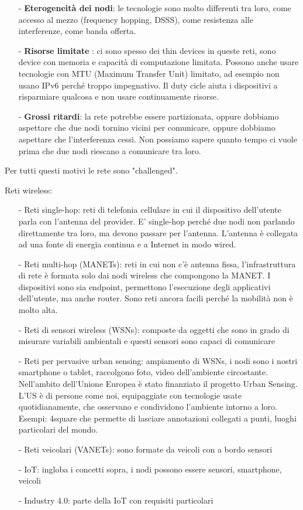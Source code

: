 \documentclass[12pt,italian]{report}
\begin{document}
\begin{itemize}
    \item[-] \textbf{Eterogeneità dei nodi}: le tecnologie sono molto differenti tra loro, come accesso al mezzo (frequency hopping, DSSS), come resistenza alle interferenze, come banda offerta. 
    
    \item[-] \textbf{Risorse limitate} : ci sono spesso dei thin devices in queste reti, sono device con memoria e capacità di computazione limitata. Possono anche usare tecnologie con MTU (Maximum Transfer Unit) limitato, ad esempio non usano IPv6 perché troppo impegnativo. Il duty cicle aiuta i dispositivi a risparmiare qualcosa e non usare continuamente risorse.
    
    \item[-] \textbf{Grossi ritardi}: la rete potrebbe essere partizionata, oppure dobbiamo aspettare che due nodi tornino vicini per comunicare, oppure dobbiamo aspettare che l'interferenza cessi. Non possiamo sapere quanto tempo ci vuole prima che due nodi riescano a comunicare tra loro. 
    
\end{itemize}
Per tutti questi motivi le rete sono "challenged".
\bigbreak

\noindent Reti wireless:
\begin{itemize}
    \item[-] Reti single-hop: reti di telefonia cellulare in cui il dispositivo dell'utente parla con l'antenna del provider. E' single-hop perché due nodi non parlando direttamente tra loro, ma devono passare per l'antenna. L'antenna è collegata ad una fonte di energia continua e a Internet in modo wired.
    \item[-] Reti multi-hop (MANETs): reti in cui non c'è antenna fissa, l'infrastruttura di rete è formata solo dai nodi wireless che compongono la MANET. I dispositivi sono sia endpoint, permettono l'esecuzione degli applicativi dell'utente, ma anche router. Sono reti ancora facili perché la mobilità non è molto alta.
    \item[-] Reti di sensori wireless (WSNs): composte da oggetti che sono in grado di misurare variabili ambientali e questi sensori sono capaci di comunicare
    \item[-] Reti per pervasive urban sensing: ampiamento di WSNs, i nodi sono i nostri smartphone o tablet, raccolgono foto, video dell'ambiente circostante. 
    Nell'ambito dell'Unione Europea è stato finanziato il progetto Urban Sensing. L'US è di persone come noi, equipaggiate con tecnologie usate quotidianamente, che osservano e condividono l'ambiente intorno a loro.
    Esempi: 4square che permette di lasciare annotazioni collegati a punti, luoghi particolari del mondo. 
    \item[-] Reti veicolari (VANETs): sono formate da veicoli con a bordo sensori
    \item[-] IoT: ingloba i concetti sopra, i nodi possono essere sensori, smartphone, veicoli
    \item[-] Industry 4.0: parte della IoT con requisiti particolari
\end{itemize}
\end{document}
